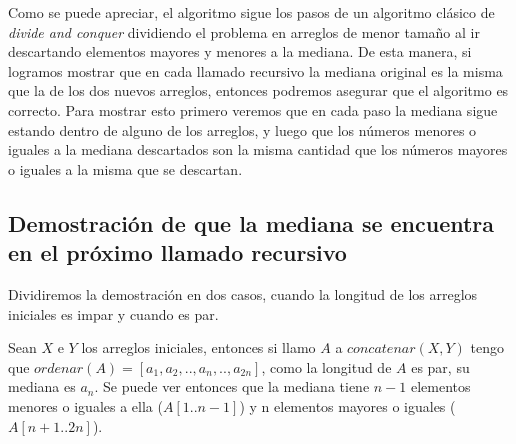 \documentclass[a4paper,10pt] {article}
\begin{document}
Como se puede apreciar, el algoritmo sigue los pasos de un algoritmo cl\'asico de \textit{divide and conquer} dividiendo el problema en arreglos de menor tama\~{n}o al ir descartando elementos mayores y menores a la mediana. De esta manera, si logramos mostrar que en cada llamado recursivo la mediana original es la misma que la de los dos nuevos arreglos, entonces podremos asegurar que el algoritmo es correcto. Para mostrar esto primero veremos que en cada paso la mediana sigue estando dentro de alguno de los arreglos, y luego que los n\'umeros menores o iguales a la mediana descartados son la misma cantidad que los n\'umeros mayores o iguales a la misma que se descartan.

\subsection*{Demostraci\'on de que la mediana se encuentra en el pr\'oximo llamado recursivo}

Dividiremos la demostraci\'on en dos casos, cuando la longitud de los arreglos iniciales es impar y cuando es par.

Sean $X$ e $Y$ los arreglos iniciales, entonces si llamo $A$ a $concatenar(X,Y)$ tengo que $ordenar(A)=[a_{1},a_{2},..,a_{n},..,a_{2n}]$, como la longitud de $A$ es par, su mediana es $a_{n}$. Se puede ver entonces que la mediana tiene $n-1$ elementos menores o iguales a ella ($A[1..n-1]$) y n elementos mayores o iguales ($A[n+1..2n]$).
\end{document}
